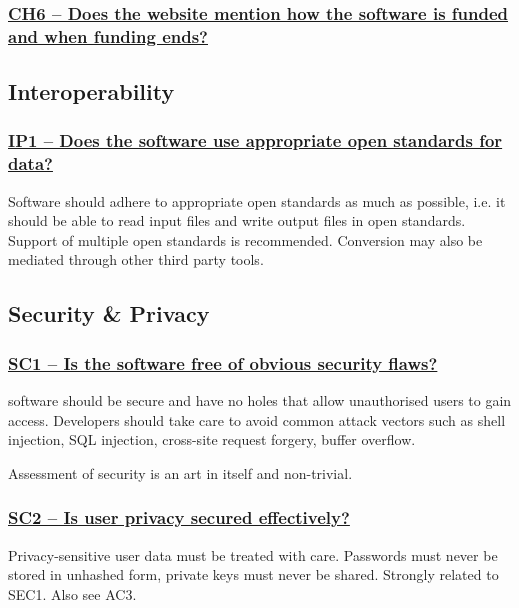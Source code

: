 \documentclass[a4paper,11pt]{article}
\newcommand{\criterion}[1]{\subsubsection*{\underline{#1}}}
\begin{document}
\criterion{CH6 -- Does the website mention how the software is funded and
when funding ends?}


\subsection{Interoperability}

\criterion{IP1 -- Does the software use appropriate open standards for data?}

Software should adhere to appropriate open standards as much as possible, i.e.
it should be able to read input files and write output files in open
standards. Support of multiple open standards is recommended. Conversion may
also be mediated through other third party tools.

\subsection{Security \& Privacy}

\criterion{SC1 -- Is the software free of obvious security flaws?}

software should be secure and have no holes that allow unauthorised users to
gain access. Developers should take care to avoid common attack vectors such as shell
injection, SQL injection, cross-site request forgery, buffer overflow. 

Assessment of security is an art in itself and non-trivial. 

\criterion{SC2 -- Is user privacy secured effectively?}

Privacy-sensitive user data must be treated with care. Passwords must never be
stored in unhashed form, private keys must never be shared. Strongly related to
SEC1. Also see AC3.
\end{document}
